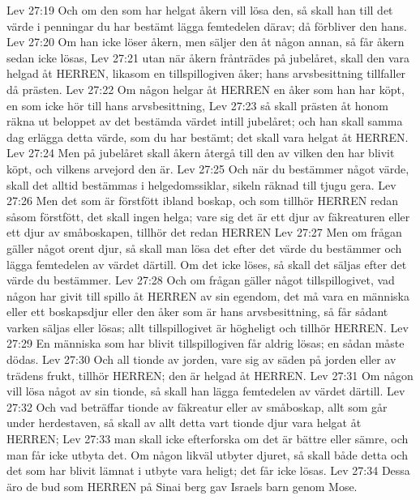 Lev 27:19  Och om den som har helgat åkern vill lösa den, så skall han till det värde i penningar du har bestämt lägga femtedelen därav; då förbliver den hans.
Lev 27:20  Om han icke löser åkern, men säljer den åt någon annan, så får åkern sedan icke lösas,
Lev 27:21  utan när åkern frånträdes på jubelåret, skall den vara helgad åt HERREN, likasom en tillspillogiven åker; hans arvsbesittning tillfaller då prästen.
Lev 27:22  Om någon helgar åt HERREN en åker som han har köpt, en som icke hör till hans arvsbesittning,
Lev 27:23  så skall prästen åt honom räkna ut beloppet av det bestämda värdet intill jubelåret; och han skall samma dag erlägga detta värde, som du har bestämt; det skall vara helgat åt HERREN.
Lev 27:24  Men på jubelåret skall åkern återgå till den av vilken den har blivit köpt, och vilkens arvejord den är.
Lev 27:25  Och när du bestämmer något värde, skall det alltid bestämmas i helgedomssiklar, sikeln räknad till tjugu gera.
Lev 27:26  Men det som är förstfött ibland boskap, och som tillhör HERREN redan såsom förstfött, det skall ingen helga; vare sig det är ett djur av fäkreaturen eller ett djur av småboskapen, tillhör det redan HERREN
Lev 27:27  Men om frågan gäller något orent djur, så skall man lösa det efter det värde du bestämmer och lägga femtedelen av värdet därtill. Om det icke löses, så skall det säljas efter det värde du bestämmer.
Lev 27:28  Och om frågan gäller något tillspillogivet, vad någon har givit till spillo åt HERREN av sin egendom, det må vara en människa eller ett boskapsdjur eller den åker som är hans arvsbesittning, så får sådant varken säljas eller lösas; allt tillspillogivet är högheligt och tillhör HERREN.
Lev 27:29  En människa som har blivit tillspillogiven får aldrig lösas; en sådan måste dödas.
Lev 27:30  Och all tionde av jorden, vare sig av säden på jorden eller av trädens frukt, tillhör HERREN; den är helgad åt HERREN.
Lev 27:31  Om någon vill lösa något av sin tionde, så skall han lägga femtedelen av värdet därtill.
Lev 27:32  Och vad beträffar tionde av fäkreatur eller av småboskap, allt som går under herdestaven, så skall av allt detta vart tionde djur vara helgat åt HERREN;
Lev 27:33  man skall icke efterforska om det är bättre eller sämre, och man får icke utbyta det. Om någon likväl utbyter djuret, så skall både detta och det som har blivit lämnat i utbyte vara heligt; det får icke lösas.
Lev 27:34  Dessa äro de bud som HERREN på Sinai berg gav Israels barn genom Mose.


